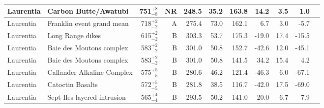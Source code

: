 \documentclass[twocolumn, switch]{article} %
\begin{document}
{\begin{landscape}
\begin{ThreePartTable}
\begin{longtable}{p{1.4 in}p{1.2 in}rrrrrrrrp{1.2 in}}
                     Laurentia &                               Carbon Butte/Awatubi &      751$^{+8}_{-8}$ &     NR &     248.5 &      35.2 & 163.8 &  14.2 &       3.5 &         1.0 &                                 \cite{Eyster2019a} \\ \hline
                     Laurentia &                          Franklin event grand mean &      718$^{+2}_{-2}$ &      A &     275.4 &      73.0 & 162.1 &   6.7 &       3.0 &        -5.7 &                               \cite{Denyszyn2009b} \\ \hline
                     Laurentia &                                   Long Range dikes &      615$^{+2}_{-2}$ &      B &     303.3 &      53.7 & 175.3 & -19.0 &      17.4 &       -15.5 &                                 \cite{Murthy1992a} \\ \hline
                     Laurentia &                           Baie des Moutons complex &      583$^{+2}_{-2}$ &      B &     301.0 &      50.8 & 152.7 & -42.6 &      12.0 &       -45.1 &                             \cite{McCausland2011a} \\ \hline
                     Laurentia &                           Baie des Moutons complex &      583$^{+2}_{-2}$ &      B &     301.0 &      50.8 & 141.5 &  34.2 &      15.4 &         4.2 &                             \cite{McCausland2011a} \\ \hline
                     Laurentia &                         Callander Alkaline Complex &      575$^{+5}_{-5}$ &      B &     280.6 &      46.2 & 121.4 & -46.3 &       6.0 &       -67.1 &                                 \cite{Symons1991a} \\ \hline
                     Laurentia &                                   Catoctin Basalts &      572$^{+5}_{-5}$ &      B &     281.8 &      38.5 & 116.7 & -42.0 &      17.5 &       -69.0 &                                  \cite{Meert1994a} \\ \hline
                     Laurentia &                        Sept-Iles layered intrusion &      565$^{+4}_{-4}$ &      B &     293.5 &      50.2 & 141.0 &  20.0 &       6.7 &        -7.9 &                                \cite{Tanczyk1987a} \\ \hline
\end{longtable}
\end{ThreePartTable}
\end{landscape}
}


\end{document}
